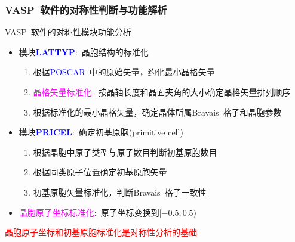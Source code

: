\documentclass[cjk,slidestop,handout,compress,mathserif,blue]{beamer}	%
\begin{document}
%
\frame
{
	\frametitle{\textrm{VASP~}软件的对称性判断与功能解析}
	\textrm{VASP~}软件的对称性模块功能分析
	\begin{itemize}
		\item 模块\textcolor{blue}{\textbf{LATTYP}}:~晶胞结构的标准化
			\begin{enumerate}
				\item 根据\textcolor{blue}{\textrm{POSCAR}~}中的原始矢量，约化最小晶格矢量\\
				\item \textcolor{magenta}{晶格矢量标准化}:~按晶轴长度和晶面夹角的大小确定晶格矢量排列顺序
				\item 根据标准化的最小晶格矢量，确定晶体所属\textrm{Bravais~}格子和晶胞参数
			\end{enumerate}
		\item 模块\textcolor{blue}{\textbf{PRICEL}}:~确定初基原胞(\textrm{primitive cell})\\
			\begin{enumerate}
				\item 根据晶胞中原子类型与原子数目判断初基原胞数目
				\item 根据同类原子位置确定初基原胞矢量
				\item 初基原胞矢量标准化，判断\textrm{Bravais~}格子一致性
			\end{enumerate}
		\item \textcolor{magenta}{晶胞原子坐标标准化}:~原子坐标变换到$[-0.5,0.5)$
	\end{itemize}
		\textcolor{red}{晶胞原子坐标和初基原胞标准化是对称性分析的基础}
}
\end{document}
